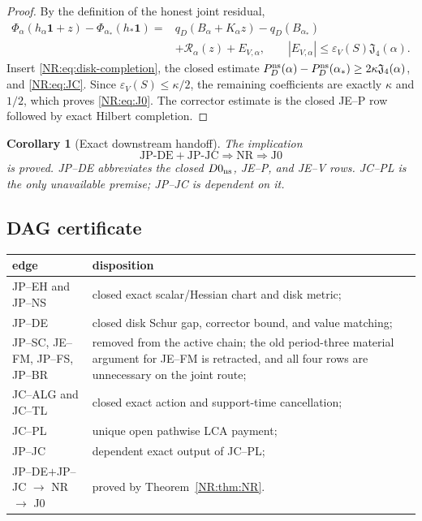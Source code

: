 \documentclass[11pt]{amsart}
\providecommand{\mathscr}{\mathcal}
\numberwithin{equation}{section}
\newtheorem{corollary}[theorem]{Corollary}
\theoremstyle{definition}
\theoremstyle{remark}
\newcommand{\Jfour}{\mathfrak J_4}
\providecommand{\mathscr}[1]{\mathcal{#1}}
\begin{document}
\begin{proof}
By the definition of the honest joint residual,
\begin{align*}
 \Phi_\alpha(h_\alpha\mathbf1+z)
 -\Phi_{\alpha_*}(h_*\mathbf1)
 ={}&q_D(B_\alpha+K_\alpha z)-q_D(B_{\alpha_*})\\
 &+\mathscr R_\alpha(z)+E_{V,\alpha},
 \qquad |E_{V,\alpha}|\le\varepsilon_V(S)\Jfour(\alpha).
\end{align*}
Insert \eqref{NR:eq:disk-completion}, the closed estimate
$P_D^{\rm ns}(\alpha)-P_D^{\rm ns}(\alpha_*)
\ge2\kappa\Jfour(\alpha)$, and \eqref{NR:eq:JC}.  Since
$\varepsilon_V(S)\le\kappa/2$, the remaining coefficients are exactly
$\kappa$ and $1/2$, which proves \eqref{NR:eq:J0}.  The corrector estimate is
the closed JE--P row followed by exact Hilbert completion.
\end{proof}

\begin{corollary}[Exact downstream handoff]\label{NR:cor:J0}
The implication
\[
 \boxed{\mathrm{JP\text{-}DE+JP\text{-}JC}
 \Longrightarrow\mathrm{NR}\Longrightarrow\mathrm{J0}}
\]
is proved.  JP--DE abbreviates the closed $D0_{\rm ns}$, JE--P, and JE--V
rows.  JC--PL is the only unavailable premise; JP--JC is dependent on it.
\end{corollary}

\subsection{DAG certificate}

\begin{center}
\begin{longtable}{>{\raggedright\arraybackslash}p{.34\linewidth}
                  >{\raggedright\arraybackslash}p{.54\linewidth}}
\toprule
edge & disposition\\
\midrule
JP--EH and JP--NS & closed exact scalar/Hessian chart and disk metric;\\
JP--DE & closed disk Schur gap, corrector bound, and value matching;\\
JP--SC, JE--FM, JP--FS, JP--BR & removed from the active chain; the old
period-three material argument for JE--FM is retracted, and all four rows
are unnecessary on the joint route;\\
JC--ALG and JC--TL & closed exact action and support-time cancellation;\\
JC--PL & unique open pathwise LCA payment;\\
JP--JC & dependent exact output of JC--PL;\\
JP--DE$+$JP--JC $\to$ NR $\to$ J0 & proved by
Theorem~\ref{NR:thm:NR}.\\
\bottomrule
\end{longtable}
\end{center}
\endgroup
\end{document}
